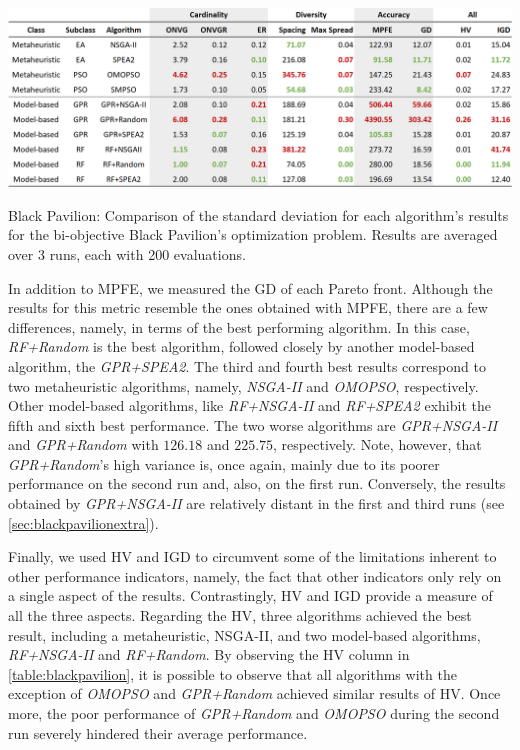 \begin{table}[htbp]
	\centering
	\includegraphics[width=\textwidth]{Images/Evaluation/BlackPavilion/Results_Std_20190416.PNG}
	\caption[Black Pavilion: Standard deviation values of the algorithms' results]{Black Pavilion: Comparison of the standard deviation for each algorithm's results for the bi-objective Black Pavilion's optimization problem. Results are averaged over 3 runs, each with 200 evaluations.}
	\label{table:blackpavilionstd}
\end{table}

In addition to \ac{MPFE}, we measured the \ac{GD} of each Pareto front. Although the results for this metric resemble the ones obtained with \ac{MPFE}, there are a few differences, namely, in terms of the best performing algorithm. In this case, \textit{RF+Random} is the best algorithm, followed closely by another model-based algorithm, the \textit{GPR+SPEA2}. The third and fourth best results correspond to two metaheuristic algorithms, namely, \textit{\ac{NSGA-II}} and \textit{OMOPSO}, respectively. Other model-based algorithms, like \textit{RF+NSGA-II} and \textit{RF+SPEA2} exhibit the fifth and sixth best performance. The two worse algorithms are \textit{GPR+NSGA-II} and \textit{GPR+Random} with $126.18$ and $225.75$, respectively. Note, however, that \textit{GPR+Random}'s high variance is, once again, mainly due to its poorer performance on the second run and, also, on the first run. Conversely, the results obtained by \textit{GPR+NSGA-II} are relatively distant in the first and third runs (see \cref{sec:blackpavilionextra}).

Finally, we used \ac{HV} and \ac{IGD} to circumvent some of the limitations inherent to other performance indicators, namely, the fact that other indicators only rely on a single aspect of the results. Contrastingly, \ac{HV} and \ac{IGD} provide a measure of all the three aspects. Regarding the \ac{HV}, three algorithms achieved the best result, including a metaheuristic, \ac{NSGA-II}, and two model-based algorithms, \textit{RF+NSGA-II} and \textit{RF+Random}. By observing the \ac{HV} column in \cref{table:blackpavilion}, it is possible to observe that all algorithms with the exception of \textit{OMOPSO} and \textit{GPR+Random} achieved similar results of \ac{HV}. Once more, the poor performance of \textit{GPR+Random} and \textit{OMOPSO} during the second run severely hindered their average performance.

